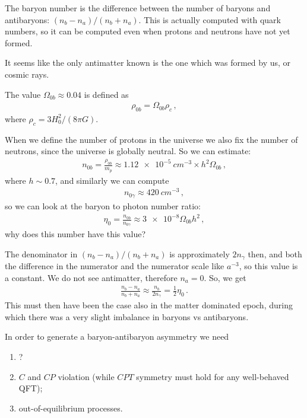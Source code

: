 \documentclass[main.tex]{subfiles}
\begin{document}
The baryon number is the difference between the number of baryons and antibaryons: \((n_b - n_a) / (n_b + n_a)\). This is actually computed with quark numbers, so it can be computed even when protons and neutrons have not yet formed.

It seems like the only antimatter known is the one which was formed by us, or cosmic rays.

The value \(\Omega_{0b} \approx 0.04\) is defined as 
%
\begin{align}
  \rho_{0b} = \Omega_{0b} \rho _{c} 
\,,
\end{align}
%
where \(\rho_c = 3 H_0^2 / (8 \pi G)\).

When we define the number of protons in the universe we also fix the number of neutrons, since the universe is globally neutral.
So we can estimate: 
%
\begin{align}
  n_{0b} = \frac{\rho_{0b}}{m_p} \approx \SI{1.12e-5}{cm^{-3}} \times h^2 \Omega_{0b}
\,,
\end{align}
%
where \(h \sim 0.7\),
and similarly we can compute 
%
\begin{align}
  n_{0 \gamma } \approx \SI{420}{cm^{-3}}
\,,
\end{align}
%
so we can 
look at the baryon to photon number ratio: 
%
\begin{align}
  \eta_0  = \frac{n_{0b}}{n_{0\gamma}}
  \approx \num{3e-8} \Omega_{0b} h^2
\,,
\end{align}
%
why does this number have this value? 

The denominator in \((n_b - n_a) / (n_b + n_a)\) is approximately \(2 n_{\gamma }\) then, and both the difference in the numerator and the numerator scale like \(a^{-3}\), so this value is a constant.
We do not see antimatter, therefore \(n_a = 0\). So, we get 
%
\begin{align}
    \frac{n_b - n_a}{n_b + n_a} \approx \frac{n_b}{2 n_\gamma } = \frac{1}{2} \eta_0 
\,.
\end{align}
%
This must then have been the case also in the matter dominated epoch, during which there was a very slight imbalance in baryons vs antibaryons.

In order to generate a baryon-antibaryon asymmetry we need \begin{enumerate}
    \item ?
    \item \(C\) and \(CP\) violation (while \(CPT\) symmetry must hold for any well-behaved QFT);
    \item out-of-equilibrium processes.
\end{enumerate}
\end{document}
